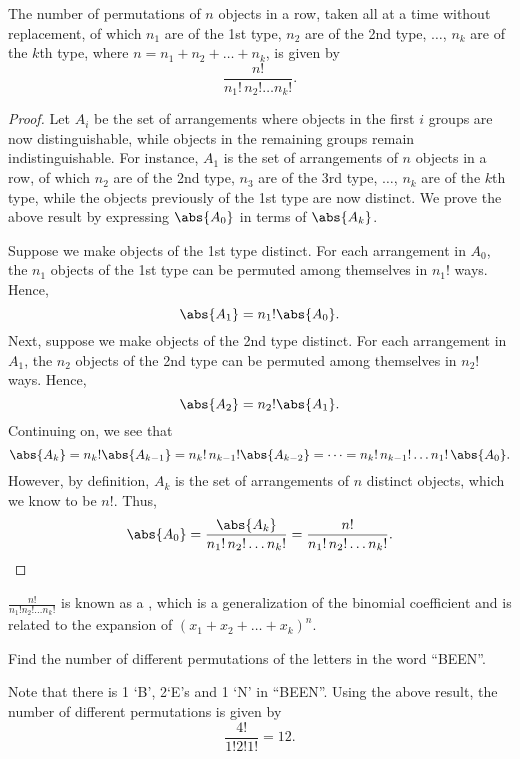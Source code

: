 \begin{proposition}
    The number of permutations of $n$ objects in a row, taken all at a time without replacement, of which $n_1$ are of the 1st type, $n_2$ are of the 2nd type, $\dots$, $n_k$ are of the $k$th type, where $n = n_1 + n_2 + \dots + n_k$, is given by \[\frac{n!}{n_1! \, n_2! \dots n_k!}.\]
\end{proposition}
\begin{proof}
    Let $A_i$ be the set of arrangements where objects in the first $i$ groups are now distinguishable, while objects in the remaining groups remain indistinguishable. For instance, $A_1$ is the set of arrangements of $n$ objects in a row, of which $n_2$ are of the 2nd type, $n_3$ are of the 3rd type, $\dots$, $n_k$ are of the $k$th type, while the objects previously of the 1st type are now distinct. We prove the above result by expressing $\abs{A_0}$ in terms of $\abs{A_k}$.

    Suppose we make objects of the 1st type distinct. For each arrangement in $A_0$, the $n_1$ objects of the 1st type can be permuted among themselves in $n_1!$ ways. Hence, \[\abs{A_1} = n_1! \abs{A_0}.\] Next, suppose we make objects of the 2nd type distinct. For each arrangement in $A_1$, the $n_2$ objects of the 2nd type can be permuted among themselves in $n_2!$ ways. Hence, \[\abs{A_2} = n_2! \abs{A_1}.\] Continuing on, we see that \[\abs{A_k} = n_k! \abs{A_{k-1}} = n_k! \, n_{k-1}! \abs{A_{k-2}} = \cdots = n_k! \, n_{k-1}! \dots n_1! \, \abs{A_0}.\] However, by definition, $A_k$ is the set of arrangements of $n$ distinct objects, which we know to be $n!$. Thus, \[\abs{A_0} = \frac{\abs{A_k}}{n_1! \, n_2! \dots n_k!} = \frac{n!}{n_1! \, n_2! \dots n_k!}.\]
\end{proof}
\begin{remark}
    $\frac{n!}{n_1! n_2! \dots n_k!}$ is known as a , which is a generalization of the binomial coefficient and is related to the expansion of $(x_1 + x_2 + \dots + x_k)^n$.
\end{remark}

\begin{sample}
    Find the number of different permutations of the letters in the word ``BEEN''.
\end{sample}
\begin{sampans}
    Note that there is 1 `B', 2`E's and 1 `N' in ``BEEN''. Using the above result, the number of different permutations is given by \[\frac{4!}{1! 2! 1!} = 12.\]
\end{sampans}

